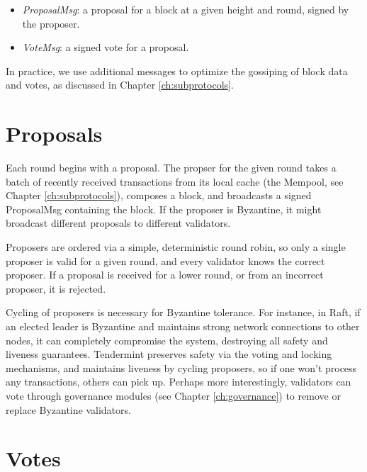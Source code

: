 \begin{itemize}
\item{\emph{ProposalMsg}: a proposal for a block at a given height and round, signed by the proposer.}
\item{\emph{VoteMsg}: a signed vote for a proposal.}
\end{itemize}

In practice, we use additional messages to optimize the gossiping of block data and votes, as discussed in Chapter \ref{ch:subprotocols}.

\section{Proposals}

Each round begins with a proposal. 
The propser for the given round takes a batch of recently received transactions from its local cache (the Mempool, see Chapter \ref{ch:subprotocols}),
composes a block, and broadcasts a signed ProposalMsg containing the block.
If the proposer is Byzantine, it might broadcast different proposals to different validators.

Proposers are ordered via a simple, deterministic round robin, 
so only a single proposer is valid for a given round, 
and every validator knows the correct proposer. 
If a proposal is received for a lower round, or from an incorrect proposer, it is rejected.

Cycling of proposers is necessary for Byzantine tolerance. 
For instance, in Raft, if an elected leader is Byzantine and maintains strong network connections to other nodes,
it can completely compromise the system, destroying all safety and liveness guarantees.
Tendermint preserves safety via the voting and locking mechanisms, 
and maintains liveness by cycling proposers, so if one won't process any transactions, others can pick up.
Perhaps more interestingly, validators can vote through governance modules (see Chapter \ref{ch:governance}) to remove or replace Byzantine validators.

\iffalse
TODO: move the tuning comment 
Upon entering a new round, validators wait ProposalTimeout to receive a complete proposal before broadcasting their pre-vote.
The ProposalTimeout thus serves as a critical paramter for tuning the performance of the system,
as it determines how much latency is permitted from proposers before validators start voting to skip them.
\fi

\section{Votes}


